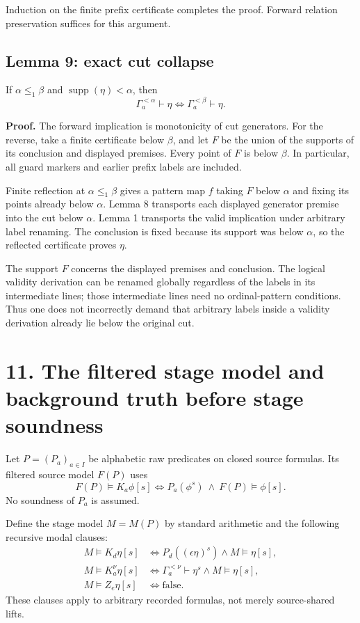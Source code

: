 \documentclass[
  11pt,
  letterpaper,
]{article}
\begin{document}
Induction on the finite prefix certificate completes the proof. Forward
relation preservation suffices for this argument.

\subsection{Lemma 9: exact cut
collapse}\label{lemma-9-exact-cut-collapse}

If \(\alpha\leq_1\beta\) and \(\operatorname{supp}(\eta)<\alpha\), then
\[
\Gamma_a^{<\alpha}\vdash\eta
\iff
\Gamma_a^{<\beta}\vdash\eta.
\tag{2}
\]

\textbf{Proof.} The forward implication is monotonicity of cut
generators. For the reverse, take a finite certificate below \(\beta\),
and let \(F\) be the union of the supports of its conclusion and
displayed premises. Every point of \(F\) is below \(\beta\). In
particular, all guard markers and earlier prefix labels are included.

Finite reflection at \(\alpha\leq_1\beta\) gives a pattern map \(f\)
taking \(F\) below \(\alpha\) and fixing its points already below
\(\alpha\). Lemma 8 transports each displayed generator premise into the
cut below \(\alpha\). Lemma 1 transports the valid implication under
arbitrary label renaming. The conclusion is fixed because its support
was below \(\alpha\), so the reflected certificate proves \(\eta\).

The support \(F\) concerns the displayed premises and conclusion. The
logical validity derivation can be renamed globally regardless of the
labels in its intermediate lines; those intermediate lines need no
ordinal-pattern conditions. Thus one does not incorrectly demand that
arbitrary labels inside a validity derivation already lie below the
original cut.

\section{11. The filtered stage model and background truth before stage
soundness}\label{the-filtered-stage-model-and-background-truth-before-stage-soundness}

Let \(P=(P_a)_{a\in I}\) be alphabetic raw predicates on closed source
formulas. Its filtered source model \(F(P)\) uses \[
F(P)\models K_a\phi[s]
\iff P_a(\phi^s)\ \land\ F(P)\models\phi[s].
\] No soundness of \(P_a\) is assumed.

Define the stage model \(M=M(P)\) by standard arithmetic and the
following recursive modal clauses: \[
\begin{aligned}
M\models K_d\eta[s]
&\iff P_d((\epsilon\eta)^s)\land M\models\eta[s],\\
M\models K_a^\nu\eta[s]
&\iff \Gamma_a^{<\nu}\vdash\eta^s\land M\models\eta[s],\\
M\models Z_e\eta[s]&\iff\text{false}.
\end{aligned}
\tag{3}
\] These clauses apply to arbitrary recorded formulas, not merely
source-shared lifts.
\end{document}
